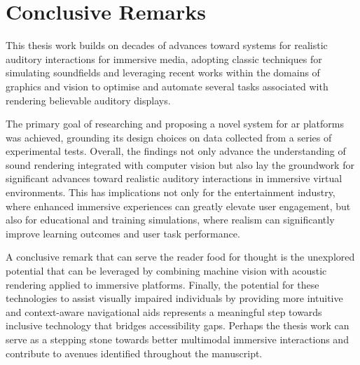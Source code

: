 \section{Conclusive Remarks}
This thesis work builds on decades of advances toward systems for realistic auditory interactions for immersive media, adopting classic techniques for simulating soundfields and leveraging recent works within the domains of graphics and vision to optimise and automate several tasks associated with rendering believable auditory displays.\par
The primary goal of researching and proposing a novel system for \acrshort{ar} platforms was achieved, grounding its design choices on data collected from a series of experimental tests. Overall, the findings not only advance the understanding of sound rendering integrated with computer vision but also lay the groundwork for significant advances toward realistic auditory interactions in immersive virtual environments. This has implications not only for the entertainment industry, where enhanced immersive experiences can greatly elevate user engagement, but also for educational and training simulations, where realism can significantly improve learning outcomes and user task performance.\par
A conclusive remark that can serve the reader food for thought is the unexplored potential that can be leveraged by combining machine vision with acoustic rendering applied to immersive platforms. Finally, the potential for these technologies to assist visually impaired individuals by providing more intuitive and context-aware navigational aids represents a meaningful step towards inclusive technology that bridges accessibility gaps. Perhaps the thesis work can serve as a stepping stone towards better multimodal immersive interactions and contribute to avenues identified throughout the manuscript.
